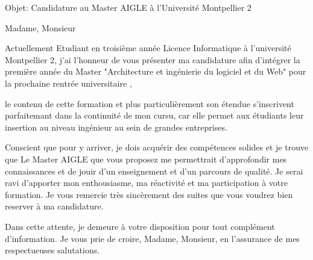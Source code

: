 \documentclass[13pt,a4paper,sans]{moderncv}
\begin{document}
\date{10 Novembre, 2014}

\opening{Objet: Candidature au Master AIGLE à l'Université Montpellier 2}
\closing{}
\makelettertitle


   Madame, Monsieur

  Actuellement Etudiant en troisième année Licence Informatique à l'université Montpellier 2, 
j'ai l'honneur de vous présenter ma candidature afin d'intégrer la première année du Master
"Architecture et ingénierie du logiciel et du Web" pour la prochaine rentrée universitaire ,

le contenu de cette formation et plus particulièrement son étendue 
s'inscrivent parfaitemant dans la continuité de mon cursu, car elle permet aux étudiants leur insertion au niveau 
ingénieur au sein de grandes entreprises. 

Conscient que pour y arriver, je dois acquérir des compétences solides et je trouve que Le Master AIGLE que vous proposez me permettrait d'approfondir
 mes connaissances et de jouir d'un enseignement et d'un parcours de qualité. Je serai ravi d'apporter mon enthousiasme,
 ma réactivité et ma   participation à votre formation. Je vous remercie
très sincèrement des suites que vous voudrez bien reserver à ma candidature.

Dans cette attente, je demeure à votre disposition pour 
tout complément d'information. Je vous prie de croire, Madame, 
Monsieur, en l'assurance de mes respectueuses salutations.
\makeletterclosing
\end{document}

